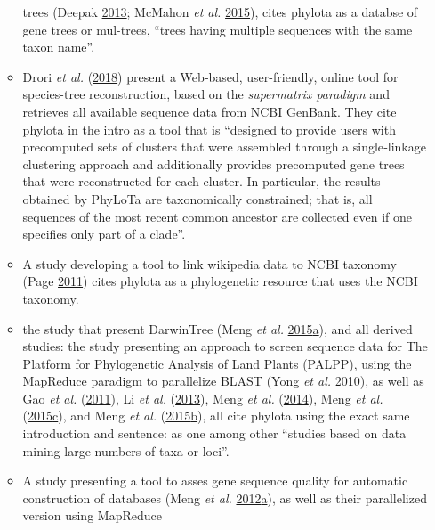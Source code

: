 \documentclass[]{article}
\begin{document}
\begin{enumerate}
\begin{itemize}
    trees (Deepak \protect\hyperlink{ref-deepak2013managing}{2013}; McMahon \emph{et al.} \protect\hyperlink{ref-mcmahon2015stbase}{2015}), cites phylota as a databse of gene trees or mul-trees,
    ``trees having multiple sequences with the same taxon name''.
  \item
    Drori \emph{et al.} (\protect\hyperlink{ref-drori2018onetwotree}{2018}) present a Web‐based, user-friendly, online tool for species-tree
    reconstruction, based on the \emph{supermatrix paradigm} and retrieves all available
    sequence data from NCBI GenBank. They cite phylota in the intro as a tool that is ``designed to provide
    users with precomputed sets of clusters that were assembled through a single‐linkage
    clustering approach and additionally provides precomputed gene trees that were
    reconstructed for each cluster. In particular, the results obtained by PhyLoTa
    are taxonomically constrained; that is, all sequences of the most recent common
    ancestor are collected even if one specifies only part of a clade''.
  \item
    A study developing a tool to link wikipedia data to NCBI taxonomy (Page \protect\hyperlink{ref-page2011linking}{2011})
    cites phylota as a phylogenetic resource that uses the NCBI taxonomy.
  \item
    the study that present DarwinTree (Meng \emph{et al.} \protect\hyperlink{ref-meng2015darwintree}{2015}\protect\hyperlink{ref-meng2015darwintree}{a}), and all derived studies: the study
    presenting an approach to screen sequence data for The Platform
    for Phylogenetic Analysis of Land Plants (PALPP), using the MapReduce paradigm
    to parallelize BLAST (Yong \emph{et al.} \protect\hyperlink{ref-yong2010screening}{2010}), as well as Gao \emph{et al.} (\protect\hyperlink{ref-gao2011solution}{2011}), Li \emph{et al.} (\protect\hyperlink{ref-li2013partfasttree}{2013}),
    Meng \emph{et al.} (\protect\hyperlink{ref-meng2014rapidtree}{2014}), Meng \emph{et al.} (\protect\hyperlink{ref-meng2015sotree}{2015}\protect\hyperlink{ref-meng2015sotree}{c}), and Meng \emph{et al.} (\protect\hyperlink{ref-meng2015solution}{2015}\protect\hyperlink{ref-meng2015solution}{b}), all cite phylota using the exact same
    introduction and sentence: as one among other ``studies based on data mining large numbers of taxa or loci''.
  \item
    A study presenting a tool to asses gene sequence quality for automatic
    construction of databases (Meng \emph{et al.} \protect\hyperlink{ref-meng2012gsqct}{2012}\protect\hyperlink{ref-meng2012gsqct}{a}), as well as their parallelized version using MapReduce

\end{itemize}
\end{enumerate}
\end{document}
